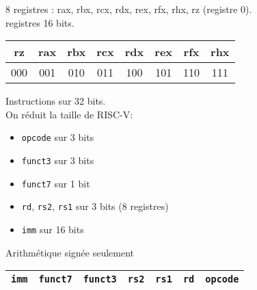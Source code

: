 \documentclass[a4paper]{article}
\begin{document}
    8 registres : rax, rbx, rcx, rdx, rex, rfx, rhx, rz (registre 0).\\
    registres 16 bits.\\
    \begin{tabular}{|c|c|c|c|c|c|c|c|}
        \hline
        rz  & rax & rbx & rcx & rdx & rex & rfx & rhx \\
        \hline
        000 & 001 & 010 & 011 & 100 & 101 & 110 & 111 \\
        \hline  
    \end{tabular}

    Instructions sur 32 bits.\\
    On réduit la taille de RISC-V:\begin{itemize}
        \item \texttt{opcode} sur 3 bits
        \item \texttt{funct3} sur 3 bits
        \item \texttt{funct7} sur 1 bit 
        \item \texttt{rd}, \texttt{rs2}, \texttt{rs1} sur 3 bits (8 registres)
        \item \texttt{imm} sur 16 bits
    \end{itemize}
    Arithmétique signée seulement

    \begin{tabular}{|c|c|c|c|c|c|c|}
        \hline
        \texttt{imm} & \texttt{funct7} & \texttt{funct3} & \texttt{rs2} & \texttt{rs1} & \texttt{rd} & \texttt{opcode} \\
        \hline
    \end{tabular}
\end{document}
